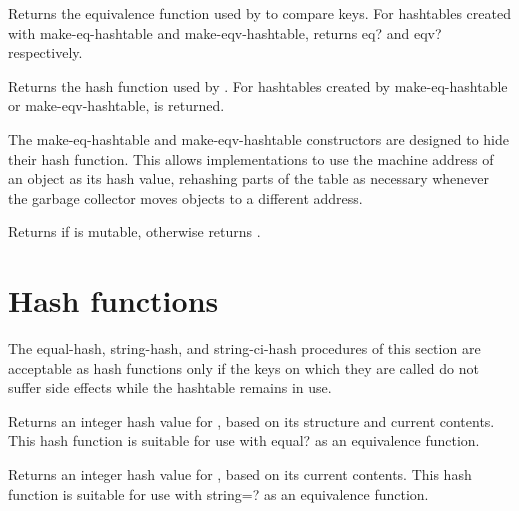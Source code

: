 \begin{entry}{}

Returns the equivalence function used by
 to compare keys.  For hashtables
created with {\cf make-eq-hashtable} and {\cf make-eqv-hashtable},
returns {\cf eq?} and {\cf eqv?} respectively.
\end{entry}

\begin{entry}{}

Returns the hash function used by .
For hashtables created by {\cf make-eq-hashtable} 
or {\cf make-eqv-hashtable}, \schfalse{} is returned.

\begin{rationale}
The {\cf make-eq-hashtable} and {\cf make-eqv-hashtable} constructors
are designed to hide their hash function.  This allows implementations
to use the machine address of an object as its hash value, rehashing
parts of the table as necessary whenever the garbage collector moves
objects to a different address.
\end{rationale}
\end{entry}

\begin{entry}{}

Returns \schtrue{} if  is mutable, otherwise returns \schfalse{}.
\end{entry}

\section{Hash functions}

The {\cf equal-hash}, {\cf string-hash}, and {\cf string-ci-hash}
procedures of this section are acceptable as hash functions only
if the keys on which they are called do not suffer side effects
while the hashtable remains in use.

\begin{entry}{}

Returns an integer hash value for , based on
its structure and current contents.  This hash function is suitable
for use with {\cf equal?} as an equivalence function.
\end{entry}

\begin{entry}{}

Returns an integer hash value for , based on
its current contents.
This hash function is suitable
for use with {\cf string=?} as an equivalence function.
\end{entry}

